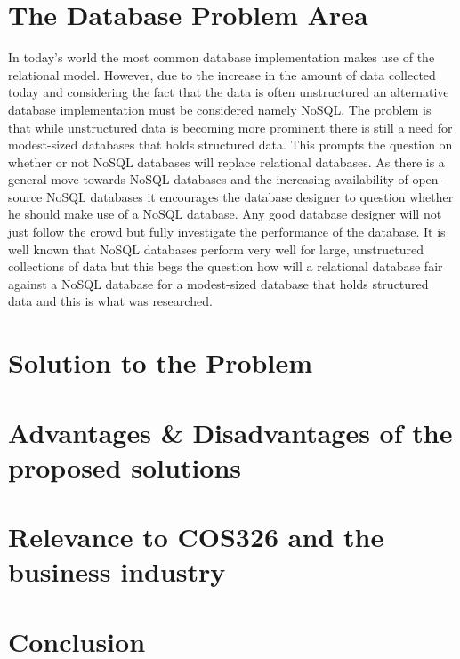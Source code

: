 \documentclass[hidelinks,english]{article}
\begin{document}
   \section{The Database Problem Area}
   In today's world the most common database implementation makes use of the relational model. However, due to the increase in the amount of data collected today and considering the fact that the data is often unstructured an alternative database implementation must be considered namely NoSQL. The problem is that while unstructured data is becoming more prominent there is still a need for modest-sized databases that holds structured data. This prompts the question on whether or not NoSQL databases will replace relational databases. As there is a general move towards NoSQL databases and the increasing availability of open-source NoSQL databases it encourages the database designer to question whether he should make use of a NoSQL database. Any good database designer will not just follow the crowd but fully investigate the performance of the database. It is well known that NoSQL databases perform very well for large, unstructured collections of data but this begs the question how will a relational database fair against a NoSQL database for a modest-sized database that holds structured data and this is what was researched. \citep{parker2013comparing}
   
   \section{Solution to the Problem}
   
   \section{Advantages & Disadvantages of the proposed solutions}
   
   \section{Relevance to COS326 and the business industry}
    
    \section{Conclusion}
	
	
	
\end{document}
